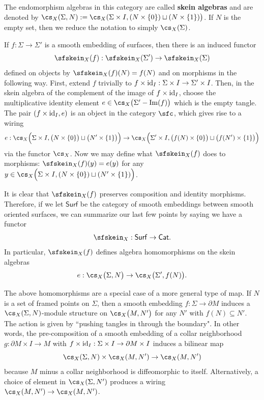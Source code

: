 
The endomorphism algebras in this category are called \textbf{skein algebras} and are denoted by $\cs_X(\Sigma, N) := \cs_X(\Sigma \times I, (N \times \{0\}) \sqcup (N \times \{1\}) \big)$. If $N$ is the empty set, then we reduce the notation to simply $\cs_X(\Sigma)$.

If $f: \Sigma \to \Sigma'$ is a smooth embedding of surfaces, then there is an induced functor 
\[
\sfskein_X(f): \sfskein_X(\Sigma') \to \sfskein_X(\Sigma)
\]
defined on objects by $\sfskein_X(f)(N) = f(N)$ and on morphisms in the following way. First, extend $f$ trivially to $f \times {\rm{id}}_I: \Sigma \times I \to \Sigma' \times I$. Then, in the skein algebra of the complement of the image of $f \times {\rm{id}}_I$, choose the multiplicative identity element $e \in \cs_X\big( \Sigma' - \im(f) \big)$ which is the empty tangle. The pair $(f \times {\rm{id}}_I, e)$ is an object in the category $\sfc$, which gives rise to a wiring
\[e: \cs_X\Big(\Sigma \times I, \big(N \times \{0\}\big) \sqcup \big(N' \times \{1\}\big) \Big) \to \cs_X\Big(\Sigma' \times I, \big(f(N) \times \{0\}\big) \sqcup \big( f(N') \times \{1\} \big) \Big)\]
via the functor $\cs_X$. Now we may define what $\sfskein_X(f)$ does to morphisms: $\sfskein_X(f)(y) = e(y)$ for any $y \in \cs_X\Big(\Sigma \times I, (N \times \{0\}) \sqcup (N' \times \{1\}) \Big)$.


It is clear that $\sfskein_X(f)$ preserves composition and identity morphisms. Therefore, if we let $\mathsf{Surf}$ be the category of smooth embeddings between smooth oriented surfaces, we can summarize our last few points by saying we have a functor
\[
\sfskein_X: \mathsf{Surf} \to \mathsf{Cat}.
\]
In particular, $\sfskein_X(f)$ defines algebra homomorphisms on the skein algebras
\[e: \cs_X\big(\Sigma, N\big) \to \cs_X\big(\Sigma', f(N)\big).\]

The above homomorphisms are a special case of a more general type of map. If $N$ is a set of framed points on $\Sigma$, then a smooth embedding $f: \Sigma \to \partial M$ induces a $\cs_X(\Sigma, N)$-module structure on $\cs_X\big(M, N'\big)$ for any $N'$ with $f(N) \subseteq N'$. The action is given by ``pushing tangles in through the boundary". In other words, the pre-composition of a smooth embedding of a collar neighborhood $g: \partial M \times I \to M$ with $f \times {\rm{id}}_I: \Sigma\times I \to \partial M \times I$ induces a bilinear map
\[
\cs_X(\Sigma, N) \times \cs_X(M, N') \to \cs_X(M, N')
\]
because $M$ minus a collar neighborhood is diffeomorphic to itself. Alternatively, a choice of element in $\cs_X(\Sigma, N')$ produces a wiring $\cs_X(M, N') \to \cs_X(M, N')$.

